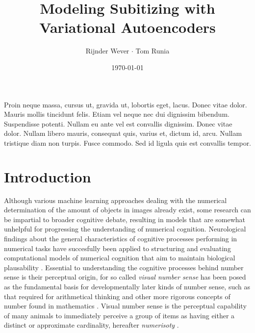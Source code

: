 \documentclass[twocolumn]{article}
\title{Modeling Subitizing with Variational Autoencoders}
\author{Rijnder Wever \(\cdot\) Tom Runia}
\date{\today}
\renewenvironment{abstract}
               {\list{}{\leftmargin}%
                \item[\hspace{7mm}\textbf{Abstract}]\relax}
               {\endlist}
\begin{document}
\maketitle

\begin{abstract}
Proin neque massa, cursus ut, gravida ut, lobortis eget, lacus.  Donec vitae dolor.  Mauris mollis tincidunt felis.  Etiam vel neque nec dui dignissim bibendum.  Suspendisse potenti.  Nullam eu ante vel est convallis dignissim.  Donec vitae dolor.  Nullam libero mauris, consequat quis, varius et, dictum id, arcu.  Nullam tristique diam non turpis.  Fusce commodo.  Sed id ligula quis est convallis tempor.  
\end{abstract}

\hypertarget{introduction}{%
\section{Introduction}\label{introduction}}

Although various machine learning approaches dealing with the numerical
determination of the amount of objects in images already exist, some
research can be impartial to broader cognitive debate, resulting in
models that are somewhat unhelpful for progressing the understanding of
numerical cognition. Neurological findings about the general characteristics of cognitive processes performing in numerical tasks have succesfully been applied to structuring and evaluating computational models of numerical cognition that aim to maintain biological plausability \citep{stoianov2012, zhang2016salient}.
Essential to understanding the
cognitive processes behind number sense is their perceptual origin, for
so called \emph{visual number sense} has been posed as the fundamental
basis for developmentally later kinds of number sense, such as that
required for arithmetical thinking and other more rigorous concepts of
number found in mathematics \citetext{\citealp[ chap.
2]{lakoff}; \citealp{numerosity-basis}}. Visual number sense is the
perceptual capability of many animals to immediately perceive a group of items as
having either a distinct or approximate cardinality, hereafter \emph{numerisoty} \citep{feigenson2004core}. 
\end{document}
